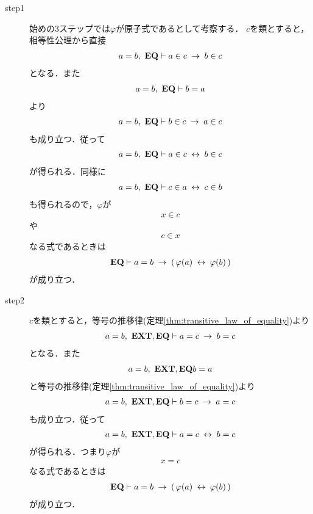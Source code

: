 	\begin{sketch}\mbox{}
		\begin{description}
			\item[step1]
				始めの$3$ステップでは$\varphi$が原子式であるとして考察する．
				$c$を類とすると，相等性公理から直接
				\begin{align}
					a = b,\ \mbox{{\bf EQ}} \vdash a \in c \hspace{0.25em}\rightarrow\hspace{0.25em} b \in c
				\end{align}
				となる．また
				\begin{align}
					a = b,\ \mbox{{\bf EQ}} \vdash b = a
				\end{align}
				より
				\begin{align}
					a = b,\ \mbox{{\bf EQ}} \vdash b \in c \hspace{0.25em}\rightarrow\hspace{0.25em} a \in c
				\end{align}
				も成り立つ．従って
				\begin{align}
					a = b,\ \mbox{{\bf EQ}} \vdash a \in c \hspace{0.25em}\leftrightarrow\hspace{0.25em} b \in c
				\end{align}
				が得られる．同様に
				\begin{align}
					a = b,\ \mbox{{\bf EQ}} \vdash c \in a \hspace{0.25em}\leftrightarrow\hspace{0.25em} c \in b
				\end{align}
				も得られるので，$\varphi$が
				\begin{align}
					x \in c
				\end{align}
				や
				\begin{align}
					c \in x
				\end{align}
				なる式であるときは
				\begin{align}
					\mbox{{\bf EQ}} \vdash a = b \hspace{0.25em}\rightarrow\hspace{0.25em} (\, \varphi(a) \hspace{0.25em}\leftrightarrow\hspace{0.25em} \varphi(b)\, )
				\end{align}
				が成り立つ．
			
			\item[step2]
				$c$を類とすると，等号の推移律(定理\ref{thm:transitive_law_of_equality})より
				\begin{align}
					a = b,\ \mbox{{\bf EXT}},\mbox{{\bf EQ}} \vdash a = c \hspace{0.25em}\rightarrow\hspace{0.25em} b = c
				\end{align}
				となる．また
				\begin{align}
					a = b,\ \mbox{{\bf EXT}},\mbox{{\bf EQ}} b = a
				\end{align}
				と等号の推移律(定理\ref{thm:transitive_law_of_equality})より
				\begin{align}
					a = b,\ \mbox{{\bf EXT}},\mbox{{\bf EQ}} \vdash b = c \hspace{0.25em}\rightarrow\hspace{0.25em} a = c
				\end{align}
				も成り立つ．従って
				\begin{align}
					a = b,\ \mbox{{\bf EXT}},\mbox{{\bf EQ}} \vdash a = c \hspace{0.25em}\leftrightarrow\hspace{0.25em} b = c
				\end{align}
				が得られる．つまり$\varphi$が
				\begin{align}
					x = c
				\end{align}
				なる式であるときは
				\begin{align}
					\mbox{{\bf EQ}} \vdash a = b \hspace{0.25em}\rightarrow\hspace{0.25em} (\, \varphi(a) \hspace{0.25em}\leftrightarrow\hspace{0.25em} \varphi(b)\, )
				\end{align}
				が成り立つ．
				

\end{description}
\end{sketch}
